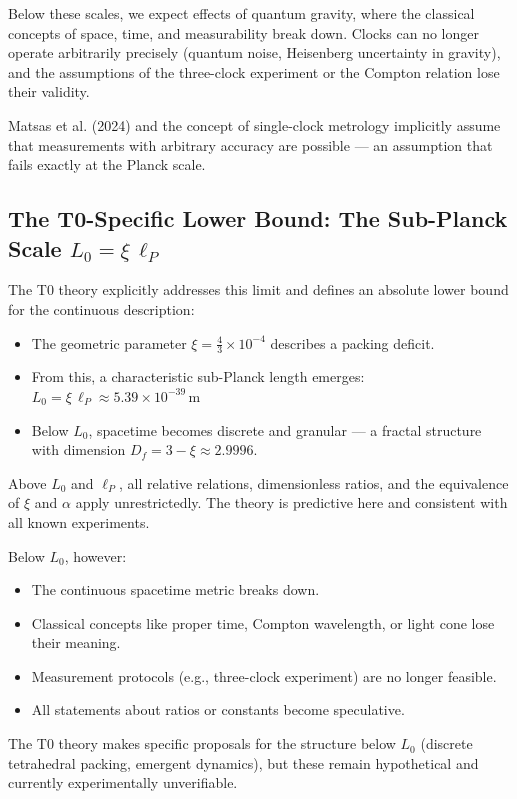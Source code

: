 	Below these scales, we expect effects of quantum gravity, where the classical concepts of space, time, and measurability break down. Clocks can no longer operate arbitrarily precisely (quantum noise, Heisenberg uncertainty in gravity), and the assumptions of the three-clock experiment or the Compton relation lose their validity.
	
	Matsas et al. (2024) and the concept of single-clock metrology implicitly assume that measurements with arbitrary accuracy are possible --- an assumption that fails exactly at the Planck scale.
	
	\subsection{The T0-Specific Lower Bound: The Sub-Planck Scale $L_0 = \xi \, \ell_P$}
	The T0 theory explicitly addresses this limit and defines an absolute lower bound for the continuous description:
	\begin{itemize}
		\item The geometric parameter $\xi = \frac{4}{3} \times 10^{-4}$ describes a packing deficit.
		\item From this, a characteristic sub-Planck length emerges:
		$L_0 = \xi \, \ell_P \approx 5.39 \times 10^{-39}\,\text{m}$
		\item Below $L_0$, spacetime becomes discrete and granular --- a fractal structure with dimension $D_f = 3 - \xi \approx 2.9996$.
	\end{itemize}
	
	Above $L_0$ and $\ell_P$, all relative relations, dimensionless ratios, and the equivalence of $\xi$ and $\alpha$ apply unrestrictedly. The theory is predictive here and consistent with all known experiments.
	
	Below $L_0$, however:
	\begin{itemize}
		\item The continuous spacetime metric breaks down.
		\item Classical concepts like proper time, Compton wavelength, or light cone lose their meaning.
		\item Measurement protocols (e.g., three-clock experiment) are no longer feasible.
		\item All statements about ratios or constants become speculative.
	\end{itemize}
	
	The T0 theory makes specific proposals for the structure below $L_0$ (discrete tetrahedral packing, emergent dynamics), but these remain hypothetical and currently experimentally unverifiable.
	
